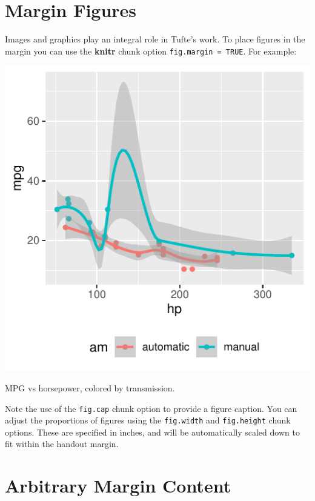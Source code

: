 \documentclass[]{tufte-book}
\begin{document}
\hypertarget{margin-figures}{%
\section{Margin Figures}\label{margin-figures}}

Images and graphics play an integral role in Tufte's work. To place
figures in the margin you can use the \textbf{knitr} chunk option
\texttt{fig.margin\ =\ TRUE}. For example:

\begin{marginfigure}
\includegraphics{FireScienceMethodsBook_files/figure-latex/fig-margin-1} \caption[MPG vs horsepower, colored by transmission]{MPG vs horsepower, colored by transmission.}\label{fig:fig-margin}
\end{marginfigure}

Note the use of the \texttt{fig.cap} chunk option to provide a figure
caption. You can adjust the proportions of figures using the
\texttt{fig.width} and \texttt{fig.height} chunk options. These are
specified in inches, and will be automatically scaled down to fit within
the handout margin.

\hypertarget{arbitrary-margin-content}{%
\section{Arbitrary Margin Content}\label{arbitrary-margin-content}}
\end{document}
